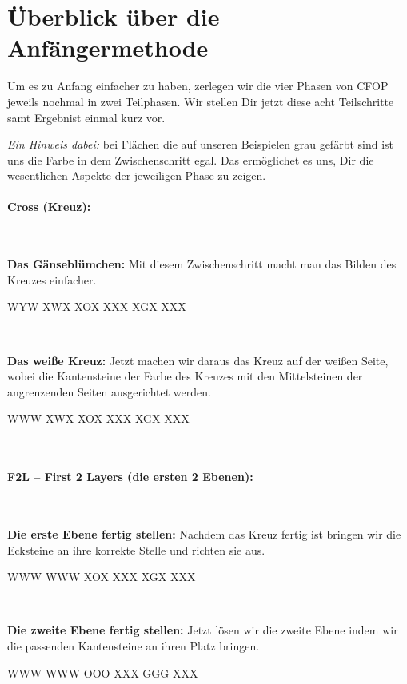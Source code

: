 \section{Überblick über die Anfängermethode}
Um es zu Anfang einfacher zu haben, zerlegen wir die vier Phasen von CFOP jeweils nochmal in zwei Teilphasen.
Wir stellen Dir jetzt diese acht Teilschritte samt Ergebnist einmal kurz vor.

\emph{Ein Hinweis dabei:} bei Flächen die auf unseren Beispielen grau gefärbt sind ist uns die Farbe in dem Zwischenschritt egal.
Das ermöglichet es uns, Dir die wesentlichen Aspekte der jeweiligen Phase zu zeigen.

\paragraph{Cross (Kreuz):} \hfill \\[1em]
\parbox{0.7\linewidth}{
\textbf{Das Gänseblümchen:} Mit diesem Zwischenschritt macht man das Bilden des Kreuzes einfacher.
}\parbox{0.3\linewidth}{
\centering
\RubikCubeGreyAll%
            {W}{Y}{W}
            {X}{W}{X}%
	       {X}{O}{X}
	       {X}{X}{X}%
	       {X}{G}{X}
	       {X}{X}{X}%
}\\[1em]
\parbox{0.7\linewidth}{
\textbf{Das weiße Kreuz:} Jetzt machen wir daraus das Kreuz auf der weißen Seite, wobei die Kantensteine der Farbe des Kreuzes mit den Mittelsteinen der angrenzenden Seiten ausgerichtet werden.
}\parbox{0.3\linewidth}{
\centering
\RubikCubeGreyAll%
            {W}{W}{W}
            {X}{W}{X}%
	       {X}{O}{X}
	       {X}{X}{X}%
	       {X}{G}{X}
	       {X}{X}{X}%
}\\[1em]
\paragraph{F2L -- First 2 Layers (die ersten 2 Ebenen):}\hfill\\[1em]
\parbox{0.7\linewidth}{
\textbf{Die erste Ebene fertig stellen:} Nachdem das Kreuz fertig ist bringen wir die Ecksteine an ihre korrekte Stelle und richten sie aus.
}\parbox{0.3\linewidth}{
\centering
\RubikCubeGreyAll%
            {W}{W}{W}
            {W}{W}{W}%
	       {X}{O}{X}
	       {X}{X}{X}%
	       {X}{G}{X}
	       {X}{X}{X}%
}\\[1em]
\parbox{0.7\linewidth}{
\textbf{Die zweite Ebene fertig stellen:} Jetzt lösen wir die zweite Ebene indem wir die passenden Kantensteine an ihren Platz bringen.
}\parbox{0.3\linewidth}{
\centering
\RubikCubeGreyAll%
            {W}{W}{W}
            {W}{W}{W}%
	       {O}{O}{O}
	       {X}{X}{X}%
	       {G}{G}{G}
	       {X}{X}{X}%
}\\[1em]

